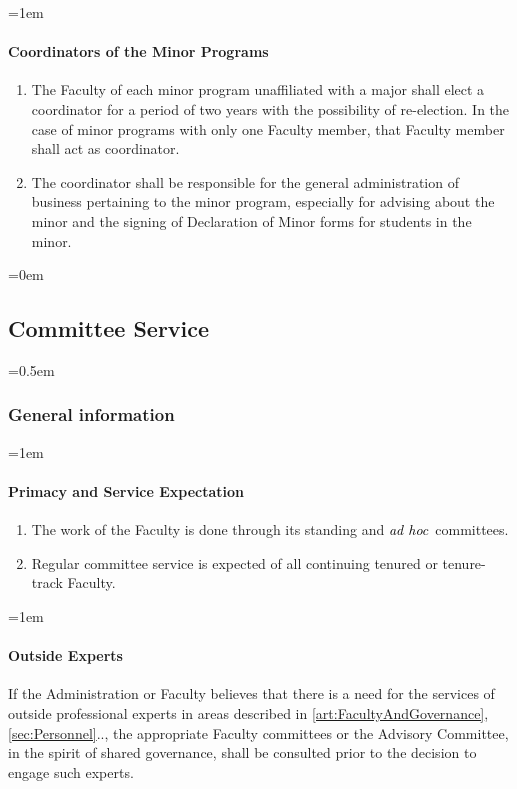 \documentclass{manual}
\newcommand{\keyword}[1]{\textcolor{black}{#1}}
\newcommand{\adho}{\keyword{\textit{ad hoc}}~}
\let\oldsubsection\subsection
\renewcommand\subsection{\leftskip=0em\oldsubsection}
\let\oldsubsubsection\subsubsection
\renewcommand\subsubsection{\leftskip=0.5em\oldsubsubsection}
\let\oldparagraph\paragraph
\renewcommand\paragraph{\leftskip=1em\oldparagraph}
\newcommand{\itemLevelA}{\alph*.}
\newcommand{\itemRefA}{\alph*}
\begin{document}
\paragraph{Coordinators of the Minor Programs}
\begin{enumerate}[label=\itemLevelA,ref=\itemRefA]
\item The Faculty of each minor program unaffiliated with a major shall elect a coordinator for a period of two years with the possibility of re-election. In the case of minor programs with only one Faculty member, that Faculty member shall act as coordinator.
\item The coordinator shall be responsible for the general administration of business pertaining to the minor program, especially for advising about the minor and the signing of Declaration of Minor forms for students in the minor.
\end{enumerate}

\subsection{Committee Service}\label{sec:CommitteeService}
\subsubsection{General information}\label{sub:GeneralInformation}

\paragraph{Primacy and Service Expectation}

\begin{enumerate}[label=\itemLevelA,ref=\itemRefA]
\item The work of the Faculty is done through its standing and \adho committees.

\item Regular committee service is expected of all continuing tenured or tenure-track Faculty.
\end{enumerate}

\paragraph{Outside Experts}
If the Administration or Faculty believes that there is a need for the services of outside professional experts in areas described in \cref{art:FacultyAndGovernance}, \cref{sec:Personnel}.., the appropriate Faculty committees or the Advisory Committee, in the spirit of shared governance, shall be consulted prior to the decision to engage such experts.
\end{document}
